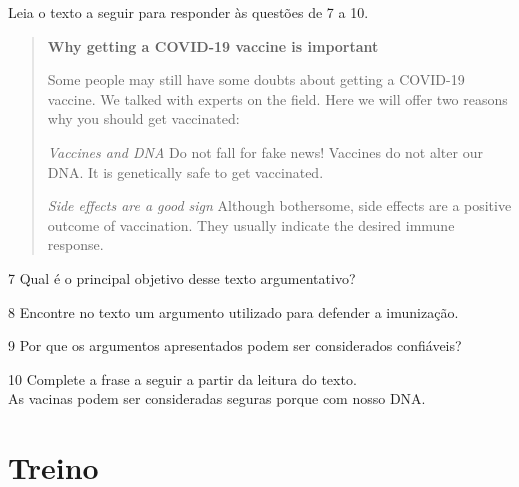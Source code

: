 Leia o texto a seguir para responder às questões de 7 a 10.

\begin{quote}
\textbf{Why getting a COVID-19 vaccine is important}

Some people may still have some doubts about getting a COVID-19 vaccine. We talked with experts on the field. Here we will offer two reasons why you should get vaccinated:

\textit{Vaccines and DNA}
Do not fall for fake news! Vaccines do not alter our DNA. It is genetically safe to get vaccinated.

\textit{Side effects are a good sign}
Although bothersome, side effects are a positive outcome of vaccination. They usually indicate the desired immune response.

\end{quote}

\num{7} Qual é o principal objetivo desse texto argumentativo?



\num{8} Encontre no texto um argumento utilizado para defender a
imunização.



\num{9} Por que os argumentos apresentados podem ser considerados
confiáveis?



\num{10} Complete a frase a seguir a partir da leitura do texto.\\
As vacinas podem ser consideradas seguras porque \preencher com nosso DNA.


\section{Treino}


